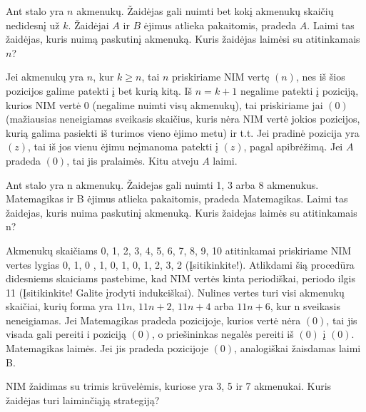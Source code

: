 \begin{pavnr}
  Ant stalo yra $n$ akmenukų. Žaidėjas gali nuimti bet kokį akmenukų skaičių
  nedidesnį už $k$. Žaidėjai $A$ ir $B$ ėjimus atlieka pakaitomis, pradeda $A$.
  Laimi tas žaidėjas, kuris nuimą paskutinį akmenuką. Kuris žaidėjas laimėsi su
  atitinkamais $n$?
\end{pavnr}

Jei akmenukų yra $n$, kur $k \geq n$, tai $n$ priskiriame NIM vertę $(n)$, nes
iš šios pozicijos galime patekti į bet kurią kitą. Iš $n=k+1$ negalime patekti
į poziciją, kurios NIM vertė $0$ (negalime nuimti visų akmenukų), tai
priskiriame jai $(0)$ (mažiausias neneigiamas sveikasis skaičius, kuris nėra
NIM vertė jokios pozicijos, kurią galima pasiekti iš turimos vieno ėjimo metu)
ir t.t. Jei pradinė pozicija yra $(z)$, tai iš jos vienu ėjimu neįmanoma
patekti į $(z)$, pagal apibrėžimą. Jei $A$ pradeda $(0)$, tai jis pralaimės.
Kitu atveju $A$ laimi.

\begin{pavnr}
  Ant stalo yra n akmenukų. Žaidejas gali nuimti 1, 3 arba 8 akmenukus.
  Matemagikas ir B ėjimus atlieka pakaitomis, pradeda Matemagikas. Laimi tas
  žaidejas, kuris nuima paskutinį akmenuką. Kuris žaidejas laimės su
  atitinkamais n?
\end{pavnr}

Akmenukų skaičiams 0, 1, 2, 3, 4, 5, 6, 7, 8, 9, 10 atitinkamai priskiriame NIM
vertes lygias 0, 1, 0 , 1, 0, 1, 0, 1, 2, 3, 2 (Įsitikinkite!). Atlikdami šią
procedūra didesniems skaiciams pastebime, kad NIM vertės kinta periodiškai,
periodo ilgis 11 (Įsitikinkite! Galite įrodyti indukciškai). Nulines vertes
turi visi akmenukų skaičiai, kurių forma yra $11n$, $11n+2$, $11n+4$ arba
$11n+6$, kur n sveikasis neneigiamas.  Jei Matemagikas pradeda pozicijoje,
kurios vertė nėra $(0)$, tai jis visada gali pereiti i poziciją $(0)$, o
priešininkas negalės pereiti iš $(0)$ į $(0)$. Matemagikas laimės. Jei jis
pradeda pozicijoje $(0)$, analogiškai žaisdamas laimi B.

\begin{pavnr}
  NIM žaidimas su trimis krūvelėmis, kuriose yra 3, 5 ir 7 akmenukai. Kuris
  žaidėjas turi laiminčiąją strategiją?
\end{pavnr}

